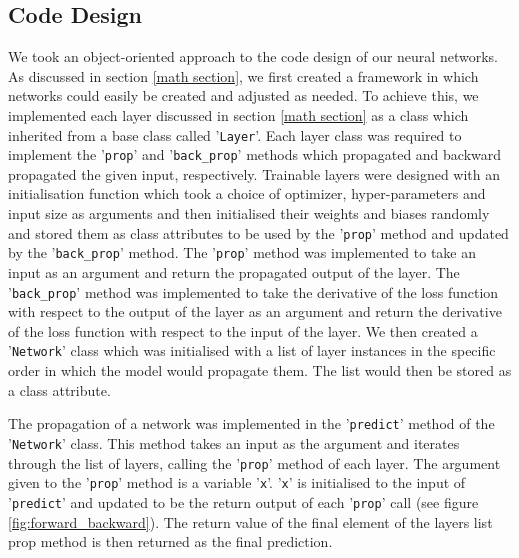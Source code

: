 \documentclass[twocolumn,pra,floatfix]{revtex4-2}
\begin{document}
        \subsection{Code Design}

            We took an object-oriented approach to the code design of our neural 
            networks. As discussed in section \ref{math section}, we first created
            a framework in which networks could easily be created and adjusted as
            needed. To achieve this, we implemented each layer discussed in
            section \ref{math section} as a class which inherited from a base
            class called '\texttt{Layer}'. Each layer class was required to
            implement the '\texttt{prop}' and '\texttt{back\_prop}' methods
            which propagated and backward propagated the given input, 
            respectively. Trainable layers were designed with an initialisation function
            which took a choice of optimizer, hyper-parameters and input size as arguments
            and then initialised their weights and biases randomly and stored them as
            class attributes to be used by the '\texttt{prop}' method and updated by the
            '\texttt{back\_prop}' method. The '\texttt{prop}' method was implemented to
            take an input as an argument and return the propagated output of the layer.
            The '\texttt{back\_prop}' method was implemented to take the derivative of the
            loss function with respect to the output of the layer as an argument and
            return the derivative of the loss function with respect to the input of the layer. We then created a '\texttt{Network}' class which was initialised with a 
            list of layer instances in the specific order in which the model 
            would propagate them. The list would then be stored as a class
            attribute.

            The propagation of a network was implemented in the '\texttt{predict}'
            method of the '\texttt{Network}' class. This method takes an input as the argument and iterates through the list of layers, 
            calling the '\texttt{prop}' method of each layer. The argument given
            to the '\texttt{prop}' method is a variable '\texttt{x}'. '\texttt{x}'
            is initialised to the input of '\texttt{predict}' and updated to be 
            the return output of each '\texttt{prop}' call (see figure
            \ref{fig:forward_backward}). The return value of the final element 
            of the layers list prop method is then returned as the final 
            prediction.
\end{document}
